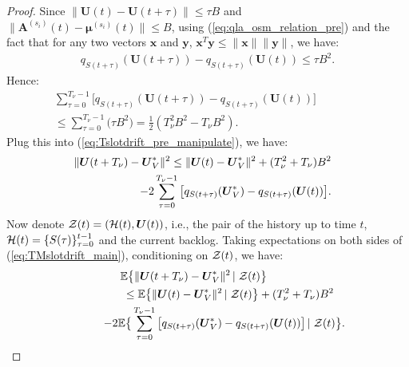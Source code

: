 \documentclass[journal]{IEEEtran}
\newcommand{\expect}[1]{\mathbb{E}\big\{#1\big\}}
\newcommand{\bv}[1]{{\boldsymbol{#1} }}
\newcommand{\script}[1]{{{\cal{#1} }}}
\begin{document}
\begin{proof}
Since $\|\bv{U}(t)-\bv{U}(t+\tau)\|\leq\tau B$ and $\|\bv{A}^{(s_i)}(t)-\bv{\mu}^{(s_i)}(t)\|\leq B$, using  (\ref{eq:qla_osm_relation_pre}) and the fact that for any two vectors $\bv{x}$ and $\bv{y}$, $\bv{x}^T\bv{y}\leq\|\bv{x}\|\|\bv{y}\|$, we have:
\begin{eqnarray}
q_{S(t+\tau)}(\bv{U}(t+\tau))-q_{S(t+\tau)}(\bv{U}(t))\leq \tau B^2.\label{eq:qsi_boundedslope}
\end{eqnarray}
Hence:
\begin{eqnarray*}
\sum_{\tau=0}^{T_{\nu}-1}\big[q_{S(t+\tau)}(\bv{U}(t+\tau))-q_{S(t+\tau)}(\bv{U}(t))\big]\qquad\qquad\\
\leq\sum_{\tau=0}^{T_{\nu}-1}\big(\tau B^2\big)=\frac{1}{2}(T_{\nu}^2B^2-T_{\nu}B^2).
\end{eqnarray*}
Plug this into (\ref{eq:Tslotdrift_pre_manipulate}), we have:
\begin{eqnarray}
&&\hspace{-.4in}\|\bv{U}(t+T_{\nu})-\bv{U}^*_V\|^2 \leq \|\bv{U}(t)-\bv{U}^*_V\|^2 + (T^2_{\nu}+T_{\nu})B^2\label{eq:TMslotdrift_main}\\
&&\qquad\qquad-2\sum_{\tau=0}^{T_{\nu}-1}\big[q_{S(t+\tau)}(\bv{U}^*_V)-q_{S(t+\tau)}(\bv{U}(t))\big].\nonumber
\end{eqnarray}
Now denote $\script{Z}(t)=(\script{H}(t), \bv{U}(t))$, i.e., the pair of the history up to time $t$, $\script{H}(t)=\{S(\tau)\}^{t-1}_{\tau=0}$ and the current backlog. Taking expectations on both sides of (\ref{eq:TMslotdrift_main}), conditioning on $\script{Z}(t)$, we have:
\begin{eqnarray*}
&&\hspace{-.25in}\expect{\|\bv{U}(t+T_{\nu})-\bv{U}^*_V\|^2\left |\right. \script{Z}(t)}\qquad\qquad\qquad\quad \\
&&\qquad\leq \expect{\|\bv{U}(t)-\bv{U}^*_V\|^2 \left|\right. \script{Z}(t)} + (T^2_{\nu}+T_{\nu})B^2\label{eq:TMslotdrift_expect}\quad\\
&&\qquad-2\expect{\sum_{\tau=0}^{T_{\nu}-1}\big[q_{S(t+\tau)}(\bv{U}^*_V) 
-q_{S(t+\tau)}(\bv{U}(t))\big]\left|\right. \script{Z}(t)}.\nonumber
\end{eqnarray*}


\end{proof}
\end{document}
